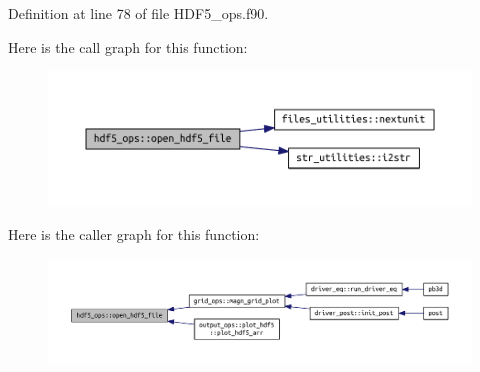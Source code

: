 Definition at line 78 of file H\+D\+F5\+\_\+ops.\+f90.

Here is the call graph for this function\+:\nopagebreak
\begin{figure}[H]
\begin{center}
\leavevmode
\includegraphics[width=350pt]{namespacehdf5__ops_a72c3974bb01858e1b232fc888d387bb6_cgraph}
\end{center}
\end{figure}
Here is the caller graph for this function\+:\nopagebreak
\begin{figure}[H]
\begin{center}
\leavevmode
\includegraphics[width=350pt]{namespacehdf5__ops_a72c3974bb01858e1b232fc888d387bb6_icgraph}
\end{center}
\end{figure}
\mbox{\label{namespacehdf5__ops_ad794d069ca355f28536fba7e0d21bc13}} 
